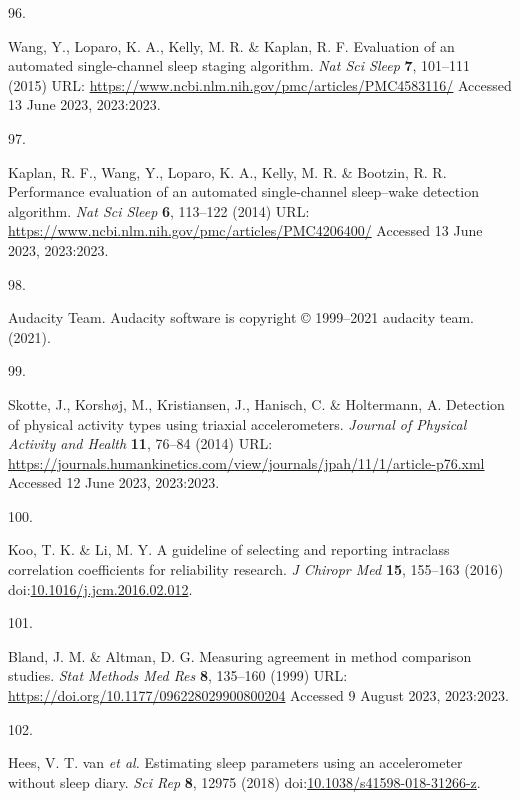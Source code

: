 \documentclass[
  9pt,
]{scrbook}
\newlength{\cslhangindent}
\newlength{\csllabelwidth}
\newlength{\cslentryspacingunit} %
\newenvironment{CSLReferences}[2] %
 {%
  \setlength{\parindent}{0pt}
  \ifodd #1
  \let\oldpar\par
  \def\par{\hangindent=\cslhangindent\oldpar}
  \fi
  \setlength{\parskip}{#2\cslentryspacingunit}
 }%
 {}
\newcommand{\CSLLeftMargin}[1]{\parbox[t]{\csllabelwidth}{#1}}
\newcommand{\CSLRightInline}[1]{\parbox[t]{\linewidth - \csllabelwidth}{#1}\break}
\begin{document}
\begin{CSLReferences}{0}{0}
\leavevmode{}%
\CSLLeftMargin{96. }%
\CSLRightInline{Wang, Y., Loparo, K. A., Kelly, M. R. \& Kaplan, R. F.
Evaluation of an automated single-channel sleep staging algorithm.
\emph{Nat Sci Sleep} \textbf{7}, 101--111 (2015) URL:
\url{https://www.ncbi.nlm.nih.gov/pmc/articles/PMC4583116/} Accessed 13
June 2023, 2023:2023.}

\leavevmode{}%
\CSLLeftMargin{97. }%
\CSLRightInline{Kaplan, R. F., Wang, Y., Loparo, K. A., Kelly, M. R. \&
Bootzin, R. R. Performance evaluation of an automated single-channel
sleep--wake detection algorithm. \emph{Nat Sci Sleep} \textbf{6},
113--122 (2014) URL:
\url{https://www.ncbi.nlm.nih.gov/pmc/articles/PMC4206400/} Accessed 13
June 2023, 2023:2023.}

\leavevmode{}%
\CSLLeftMargin{98. }%
\CSLRightInline{Audacity Team. Audacity\textregistered{} software is
copyright © 1999--2021 audacity team. (2021).}

\leavevmode{}%
\CSLLeftMargin{99. }%
\CSLRightInline{Skotte, J., Korshøj, M., Kristiansen, J., Hanisch, C. \&
Holtermann, A. Detection of physical activity types using triaxial
accelerometers. \emph{Journal of Physical Activity and Health}
\textbf{11}, 76--84 (2014) URL:
\url{https://journals.humankinetics.com/view/journals/jpah/11/1/article-p76.xml}
Accessed 12 June 2023, 2023:2023.}

\leavevmode{}%
\CSLLeftMargin{100. }%
\CSLRightInline{Koo, T. K. \& Li, M. Y. A guideline of selecting and
reporting intraclass correlation coefficients for reliability research.
\emph{J Chiropr Med} \textbf{15}, 155--163 (2016)
doi:\href{https://doi.org/10.1016/j.jcm.2016.02.012}{10.1016/j.jcm.2016.02.012}.}

\leavevmode{}%
\CSLLeftMargin{101. }%
\CSLRightInline{Bland, J. M. \& Altman, D. G. Measuring agreement in
method comparison studies. \emph{Stat Methods Med Res} \textbf{8},
135--160 (1999) URL: \url{https://doi.org/10.1177/096228029900800204}
Accessed 9 August 2023, 2023:2023.}

\leavevmode{}%
\CSLLeftMargin{102. }%
\CSLRightInline{Hees, V. T. van \emph{et al.} Estimating sleep
parameters using an accelerometer without sleep diary. \emph{Sci Rep}
\textbf{8}, 12975 (2018)
doi:\href{https://doi.org/10.1038/s41598-018-31266-z}{10.1038/s41598-018-31266-z}.}


\end{CSLReferences}
\end{document}
